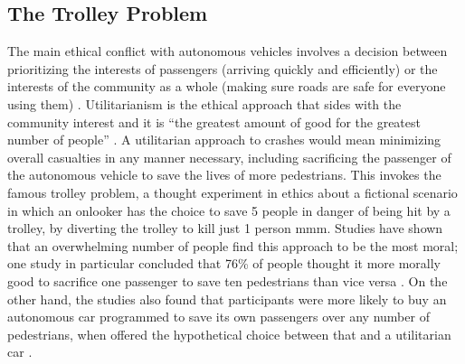 \documentclass[10pt,twocolumn]{article}
\begin{document}
\subsection{The Trolley Problem}
The main ethical conflict with autonomous vehicles involves a decision between prioritizing the interests of passengers (arriving quickly and efficiently) or the interests of the community as a whole (making sure roads are safe for everyone using them)  \cite{AutonomousAccidents}. Utilitarianism is the ethical approach that sides with the community interest and it is “the greatest amount of good for the greatest number of people”  \cite{AutonomousAccidents}. A utilitarian approach to crashes would mean minimizing overall casualties in any manner necessary, including sacrificing the passenger of the autonomous vehicle to save the lives of more pedestrians. This invokes the famous trolley problem, a thought experiment in ethics about a fictional scenario in which an onlooker has the choice to save 5 people in danger of being hit by a trolley, by diverting the trolley to kill just 1 person mmm.  Studies have shown that an overwhelming number of people find this approach to be the most moral; one study in particular concluded that 76\% of people thought it more morally good to sacrifice one passenger to save ten pedestrians than vice versa  \cite{AutonomousAccidents}. On the other hand, the studies also found that participants were more likely to buy an autonomous car programmed to save its own passengers over any number of pedestrians, when offered the hypothetical choice between that and a utilitarian car  \cite{AutonomousAccidents}.
\end{document}
